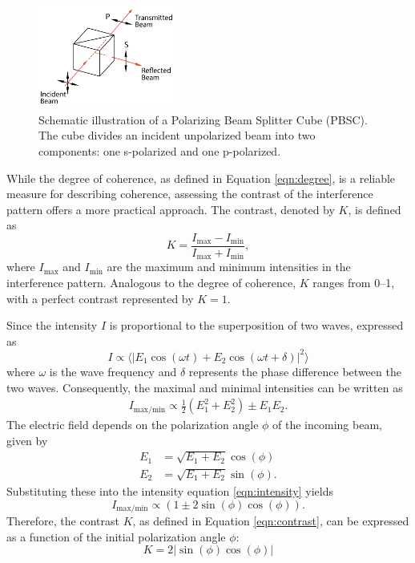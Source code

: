 \begin{figure}
    \centering
    \includegraphics[width=0.4\textwidth]{pictures/PBSC.png}
    \caption{Schematic illustration of a Polarizing Beam Splitter Cube (PBSC). The cube divides an incident unpolarized beam into two components: one s-polarized and one p-polarized. \cite{PBSC}}
    \label{fig:PBSC}
\end{figure}

While the degree of coherence, as defined in Equation \eqref{eqn:degree}, is a reliable 
measure for describing coherence, assessing the contrast of the interference pattern 
offers a more practical approach. The contrast, denoted by $K$, is defined as
\begin{equation}
    K=\frac{I_\text{max}-I_\text{min}}{I_\text{max}+I_\text{min}},
    \label{eqn:contrast}
\end{equation}
where $I_\text{max}$ and $I_\text{min}$ are the maximum and minimum intensities in the 
interference pattern. Analogous to the degree of coherence, $K$ ranges from 
\numrange{0}{1}, with a perfect contrast represented by $K=1$.

Since the intensity $I$ is proportional to the superposition of two waves, expressed as
\begin{equation}
    I\propto \langle |E_1\cos(\omega t)+E_2\cos(\omega t +\delta)|^2 \rangle
    \label{eqn:intensity}
\end{equation}
where $\omega$ is the wave frequency and $\delta$ represents the phase difference 
between the two waves. Consequently, the maximal and minimal intensities can be written as
\begin{align*}
    I_\text{max/min}\propto\frac{1}{2}(E_1^2+E_2^2)\pm E_1E_2.
\end{align*}
The electric field depends on the polarization angle $\phi$ of the incoming beam, given by
\begin{align*}
    E_1&=\sqrt{E_1+E_2}\cos(\phi) \\
    E_2&=\sqrt{E_1+E_2}\sin(\phi).
\end{align*}
Substituting these into the intensity equation \eqref{eqn:intensity} yields
\begin{equation*}
    I_\text{max/min}\propto (1\pm 2\sin(\phi)\cos(\phi)).
\end{equation*}
Therefore, the contrast $K$, as defined in Equation \eqref{eqn:contrast}, can be 
expressed as a function of the initial polarization angle $\phi$:
\begin{equation}
    K=2|\sin(\phi)\cos(\phi)|
    \label{eqn:contrast2}
\end{equation}

